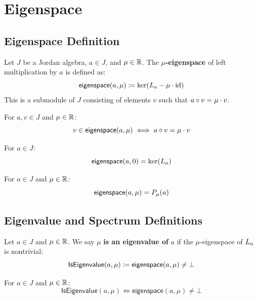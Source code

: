 \section{Eigenspace}

\subsection{Eigenspace Definition}

\begin{definition}[eigenspace]
Let $J$ be a Jordan algebra, $a \in J$, and $\mu \in \mathbb{R}$. The \textbf{$\mu$-eigenspace} of left multiplication by $a$ is defined as:
\[ \mathsf{eigenspace}(a, \mu) \coloneqq \ker(L_{a} - \mu \cdot \mathrm{id}) \]
This is a submodule of $J$ consisting of elements $v$ such that $a \circ v = \mu \cdot v$.
\end{definition}

\begin{lemma}
For $a, v \in J$ and $\mu \in \mathbb{R}$:
\[ v \in \mathsf{eigenspace}(a, \mu) \iff a \circ v = \mu \cdot v \]
\end{lemma}

\begin{lemma}
For $a \in J$:
\[ \mathsf{eigenspace}(a, 0) = \ker(L_{a}) \]
\end{lemma}

\begin{theorem}
For $a \in J$ and $\mu \in \mathbb{R}$:
\[ \mathsf{eigenspace}(a, \mu) = P_{\mu}(a) \]
\end{theorem}

\subsection{Eigenvalue and Spectrum Definitions}

\begin{definition}[IsEigenvalue]
Let $a \in J$ and $\mu \in \mathbb{R}$. We say $\mu$ \textbf{is an eigenvalue of} $a$ if the $\mu$-eigenspace of $L_{a}$ is nontrivial:
\[ \mathsf{IsEigenvalue}(a, \mu) \coloneqq \mathsf{eigenspace}(a, \mu) \ne \bot \]
\end{definition}

\begin{lemma}
For $a \in J$ and $\mu \in \mathbb{R}$:
\[ \mathsf{IsEigenvalue}(a, \mu) \iff \mathsf{eigenspace}(a, \mu) \ne \bot \]
\end{lemma}

